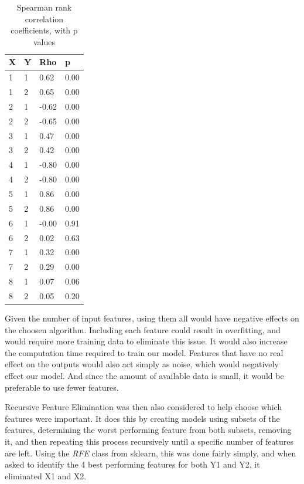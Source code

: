 \documentclass[12pt]{article}
\begin{document}
\begin{table}[!ht]
\centering
\caption{Spearman rank correlation coefficients, with p values}
\label{tbl:spearman-table}
\begin{tabular}{||llll||}
\hline
X    				& Y & Rho   & p    \\
\hline
1                   & 1 & 0.62  & 0.00 \\
1                   & 2 & 0.65  & 0.00 \\
2                   & 1 & -0.62 & 0.00 \\
2                   & 2 & -0.65 & 0.00 \\
3                   & 1 & 0.47  & 0.00 \\
3                   & 2 & 0.42  & 0.00 \\
4                   & 1 & -0.80 & 0.00 \\
4                   & 2 & -0.80 & 0.00 \\
5                   & 1 & 0.86  & 0.00 \\
5                   & 2 & 0.86  & 0.00 \\
6                   & 1 & -0.00 & 0.91 \\
6                   & 2 & 0.02  & 0.63 \\
7                   & 1 & 0.32  & 0.00 \\
7                   & 2 & 0.29  & 0.00 \\
8                   & 1 & 0.07  & 0.06 \\
8                   & 2 & 0.05  & 0.20 \\
\hline
\end{tabular}
\end{table}

Given the number of input features, using them all would have negative effects on the choosen algorithm. Including each feature could result in overfitting, and would require more training data to eliminate this issue. It would also increase the computation time required to train our model. Features that have no real effect on the outputs would also act simply as noise, which would negatively effect our model. And since the amount of available data is small, it would be preferable to use fewer features.

Recursive Feature Elimination was then also considered to help choose which features were important. It does this by creating models using subsets of the features, determining the worst performing feature from both subsets, removing it, and then repeating this process recursively until a specific number of features are left. Using the \emph{RFE} class from sklearn, this was done fairly simply, and when asked to identify the 4 best performing features for both Y1 and Y2, it eliminated X1 and X2. 
\end{document}
